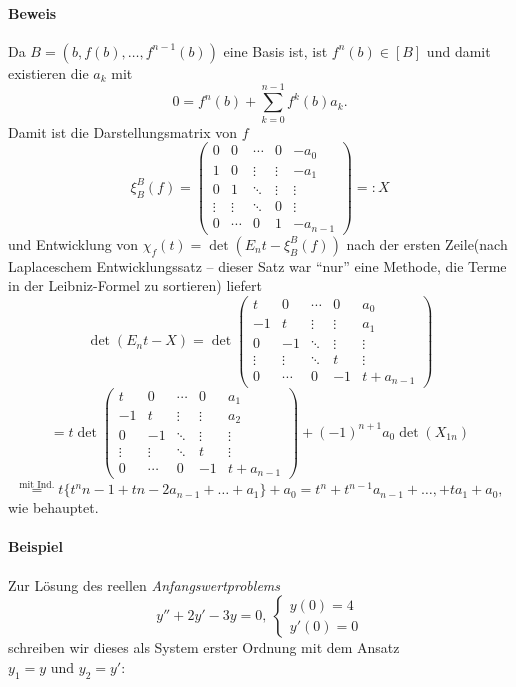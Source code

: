\paragraph{Beweis}
	Da $ B= \left(b,f(b),\dots,f^{n-1}(b)\right) $ eine Basis ist, ist $ f^n(b)\in [B] $ und damit existieren die $ a_k $ mit
		\[ 0 = f^n(b) + \sum_{k=0}^{n-1}f^k(b)a_k. \]
	Damit ist die Darstellungsmatrix von $ f $
		\[ \xi_B^B(f) =
		\begin{pmatrix}
		0 & 0 & \cdots & 0 & -a_0 \\ 
		1 & 0 & \vdots & \vdots & -a_1 \\ 
		0 & 1 & \ddots & \vdots & \vdots \\ 
		\vdots & \vdots & \ddots & 0 & \vdots \\ 
		0 & \cdots & 0 & 1 & -a_{n-1}
		\end{pmatrix} =: X\]
	und Entwicklung von $ \chi_f(t)=\det(E_nt-\xi_B^B(f)) $ nach der ersten Zeile(nach Laplaceschem Entwicklungssatz -- dieser Satz war "`nur"' eine Methode, die Terme in der Leibniz-Formel zu sortieren) liefert
		\[ \det(E_nt-X) = \det 
		\begin{pmatrix}
		t & 0 & \cdots & 0 & a_0 \\ 
		-1 & t & \vdots & \vdots & a_1 \\ 
		0 & -1 & \ddots & \vdots & \vdots \\ 
		\vdots & \vdots & \ddots & t & \vdots \\ 
		0 & \cdots & 0 & -1 & t+a_{n-1}
		\end{pmatrix} \]
		\[ = t \det \begin{pmatrix}
		t & 0 & \cdots & 0 & a_1 \\ 
		-1 & t & \vdots & \vdots & a_2 \\ 
		0 & -1 & \ddots & \vdots & \vdots \\ 
		\vdots & \vdots & \ddots & t & \vdots \\ 
		0 & \cdots & 0 & -1 & t+a_{n-1}
		\end{pmatrix} + (-1)^{n+1} a_0 \det(X_{1n}) \]
		\[ \overset{\text{mit Ind.}}{=} t \{t^n{n-1}+t{n-2}a_{n-1}+\dots+a_1\}+a_0 = t^n+t^{n-1}a_{n-1}+\dots,+ta_1+a_0, \]
	wie behauptet.
	
\paragraph{Beispiel}
	Zur Lösung des reellen \emph{Anfangswertproblems}
		\[ y'' + 2y' - 3y = 0,\ 
		\begin{cases}
			y(0)=4 \\
			y'(0)=0
		\end{cases} \]
	schreiben wir dieses als System erster Ordnung mit dem Ansatz $ y_1 = y \text{ und }y_2 = y' $:
	
